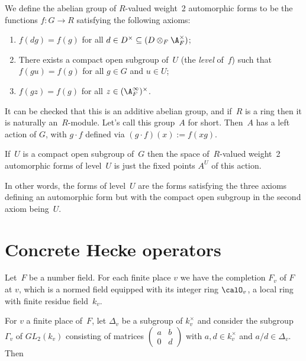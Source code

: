 \begin{definition}
  \label{TotallyDefiniteQuaternionAlgebra.WeightTwoAutomorphicForm}
  \leanok
  We define the abelian group of $R$-valued weight~2 automorphic forms
to be the functions $f:G\to R$ satisfying the following axioms:
\begin{enumerate}
  \item $f(dg)=f(g)$ for all $d\in D^\times\subseteq(D\otimes_F\A_F^\times)$;
  \item There exists a compact open subgroup of~$U$ (the \emph{level} of~$f$)
    such that $f(gu)=f(g)$ for all $g\in G$ and $u\in U$;
  \item $f(gz)=f(g)$ for all $z\in(\A_F^\infty)^\times$.
\end{enumerate}
\end{definition}

It can be checked that this is an additive abelian group, and if~$R$ is a ring
then it is naturally an~$R$-module. Let's call this group~$A$ for short.
Then~$A$ has a left action of $G$, with $g\cdot f$
defined via $(g\cdot f)(x):=f(xg)$.

\begin{definition}
  \label{TotallyDefiniteQuaternionAlgebra.WeightTwoAutomorphicFormOfLevel}
  \leanok
  If~$U$ is a compact open subgroup of~$G$ then the space of~$R$-valued weight~2
  automorphic forms of level~$U$ is just the fixed points $A^U$ of this action.
\end{definition}

In other words, the forms of level~$U$ are the forms satisfying the three axioms
defining an automorphic form but with the compact open subgroup in the second
axiom being~$U$.

\section{Concrete Hecke operators}

Let~$F$ be a number field. For each finite place $v$ we have the completion $F_v$ of $F$ at $v$,
which is a normed field equipped with its integer ring $\calO_v$, a local ring with
finite residue field~$k_v$.

For $v$ a finite place of~$F$, let $\Delta_v$ be a subgroup of $k_v^\times$ and consider
the subgroup $\Gamma_v$ of $GL_2(k_v)$ consisting of matrices $\begin{pmatrix}a&b\\0&d\end{pmatrix}$
with $a,d\in k_v^\times$ and $a/d\in\Delta_v$. Then

